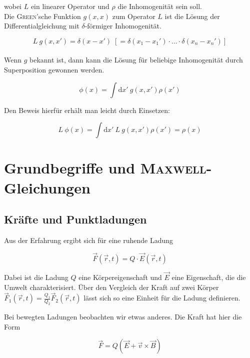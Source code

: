 wobei $L$ ein linearer Operator und $\rho$ die Inhomogenität sein soll.\
\\
Die \textsc{Green}'sche Funktion $g(x,x)$ zum Operator $L$ ist die Lösung der Differentialgleichung mit $\delta$-förmiger Inhomogenität.

\begin{equation*}
L \ g(x,x') = \delta (x-x') \; [= \delta(x_1-x_1')\cdot\dotsc\cdot\delta(x_n - x_n')]
\end{equation*}
\ \\
Wenn $g$ bekannt ist, dann kann die Lösung für beliebige Inhomogenität durch Superposition gewonnen werden.

\begin{equation*}
\phi (x) = \int\mathrm{d}x' \ g(x,x') \rho(x')
\end{equation*}

Den Beweis hierfür erhält man leicht durch Einsetzen:

\begin{equation*}
L \ \phi(x) = \int\mathrm{d}x' \ L \ g(x,x') \rho(x') = \rho(x)
\end{equation*}


\chapter{Grundbegriffe und \textsc{Maxwell}-Gleichungen}
\section{Kräfte und Punktladungen}

Aus der Erfahrung ergibt sich für eine ruhende Ladung

\begin{equation*}
\vec{F}(\vec{r},t)=Q\cdot\vec{E}(\vec{r},t)
\end{equation*}

Dabei ist die Ladung $Q$ eine Körpereigenschaft und $\vec{E}$ eine Eigenschaft, die die Umwelt charakterisiert. Über den Vergleich der Kraft auf zwei Körper $\vec{F}_1(\vec{r},t)=\frac{Q_1}{Q_2}\vec{F}_2(\vec{r},t)$ lässt sich so eine Einheit für die Ladung definieren.\\
\linebreak

Bei bewegten Ladungen beobachten wir etwas anderes. Die Kraft hat hier die Form

\begin{equation*}
\vec{F}=Q(\vec{E}+\vec{v}\times\vec{B})
\end{equation*}

